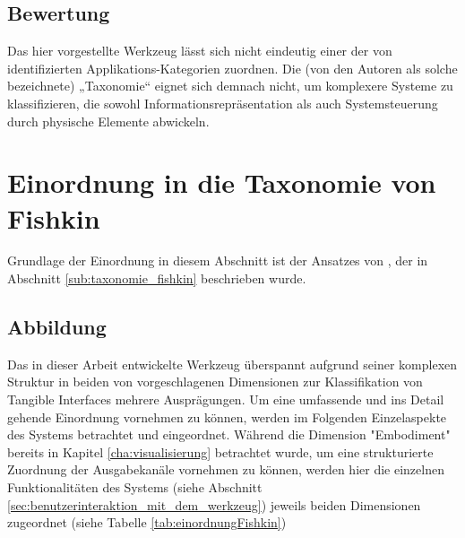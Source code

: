 \subsection{Bewertung}

Das hier vorgestellte Werkzeug lässt sich nicht eindeutig einer der von \citet{Klemmer04} identifizierten Applikations-Kategorien zuordnen. Die (von den Autoren als solche bezeichnete) „Taxonomie“ eignet sich demnach nicht, um komplexere Systeme zu klassifizieren, die sowohl Informationsrepräsentation als auch Systemsteuerung durch physische Elemente abwickeln.


\section{Einordnung in die Taxonomie von Fishkin} %
\label{sec:einordnung_in_die_taxonomie_von_fishkin}

Grundlage der Einordnung in diesem Abschnitt ist der Ansatzes von \citep{Fishkin04}, der in Abschnitt \ref{sub:taxonomie_fishkin} beschrieben wurde.

\subsection{Abbildung}
Das in dieser Arbeit entwickelte Werkzeug überspannt aufgrund seiner komplexen Struktur in beiden von \citeauthor{Fishkin04} vorgeschlagenen Dimensionen zur Klassifikation von Tangible Interfaces mehrere Ausprägungen. Um eine umfassende und ins Detail gehende Einordnung vornehmen zu können, werden im Folgenden Einzelaspekte des Systems betrachtet und eingeordnet. Während die Dimension "Embodiment" bereits in Kapitel \ref{cha:visualisierung} betrachtet wurde, um eine strukturierte Zuordnung der Ausgabekanäle vornehmen zu können, werden hier die einzelnen Funktionalitäten des Systems (siehe Abschnitt \ref{sec:benutzerinteraktion_mit_dem_werkzeug}) jeweils beiden Dimensionen zugeordnet (siehe Tabelle \ref{tab:einordnungFishkin})


